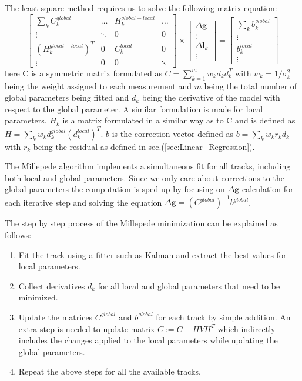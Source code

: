 The least square method requires us to solve the following matrix equation:
\begin{equation}
\begin{bmatrix}
    \sum_k C_k^{global} & \dots & H_k^{global-local} & \dots \\
    \vdots & \ddots & 0 & 0 \\
    (H_k^{global-local})^T & 0 & C_k^{local} & 0 \\
    \vdots & 0 & 0 & \ddots
\end{bmatrix}
\times
\begin{bmatrix}
    \Delta \textbf{g} \\
    \vdots  \\
    \Delta \textbf{l}_k \\
    \vdots
\end{bmatrix}
=
\begin{bmatrix}
    \sum_k b_k^{global}  \\
    \vdots  \\
    b_k^{local} \\
    \vdots
\end{bmatrix}
\end{equation}
here C is a symmetric matrix formulated as $C = \sum_{k=1}^m w_k d_k d_k^T $ with $w_k = 1/\sigma_k^2$ being the weight assigned to each measurement and $m$ being the total number of global parameters being fitted and $d_k$ being the derivative of the model with respect to the global parameter. A similar formulation is made for local parameters. $H_k$ is a matrix formulated in a similar way as to C and is defined as $H= \sum_k w_k d_k^{global} (d_k^{local})^T$. $b$ is the correction vector defined as $b = \sum_k w_k r_k d_k$ with $r_k$ being the residual as defined in sec.(\ref{sec:Linear_Regression}).

The Millepede algorithm implements a simultaneous fit for all tracks, including both local and global parameters. Since we only care about corrections to the global parameters the computation is sped up by focusing on $\Delta\textbf{g}$ calculation for each iterative step and solving the equation $\Delta\textbf{g} = (C^{global})^{-1} b^{global}$.

The step by step process of the Millepede minimization can be explained as follows:
\begin{enumerate}
    \item Fit the track using a fitter such as Kalman and extract the best values for local parameters.
    \item Collect derivatives $d_k$ for all local and global parameters that need to be minimized.
    \item Update the matrices $C^{global}$ and $b^{global}$ for each track by simple addition. An extra step is needed to update matrix $C:= C - HVH^T$ which indirectly includes the changes applied to the local parameters while updating the global parameters.
    \item Repeat the above steps for all the available tracks.
\end{enumerate}

